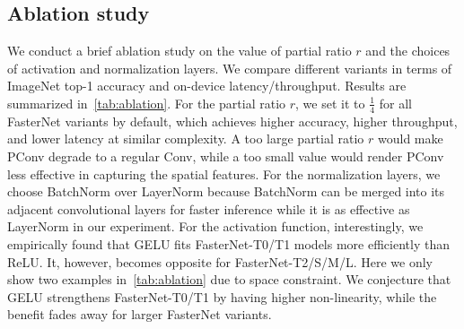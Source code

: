 \subsection{Ablation study}
We conduct a brief ablation study on the value of partial ratio $r$ and the choices of activation and normalization layers. We compare different variants in terms of ImageNet top-1 accuracy and on-device latency/throughput. Results are summarized in~\cref{tab:ablation}. For the partial ratio $r$, we set it to $\frac{1}{4}$ for all FasterNet variants by default, which achieves higher accuracy, higher throughput, and lower latency at similar complexity. A too large partial ratio $r$ would make PConv degrade to a regular Conv, while a too small value would render PConv less effective in capturing the spatial features. 
For the normalization layers, we choose BatchNorm over LayerNorm because BatchNorm can be merged into its adjacent convolutional layers for faster inference while it is as effective as LayerNorm in our experiment.
For the activation function, interestingly, we empirically found that GELU fits FasterNet-T0/T1 models more efficiently than ReLU. It, however, becomes opposite for FasterNet-T2/S/M/L. Here we only show two examples in~\cref{tab:ablation} due to space constraint. We conjecture that GELU strengthens FasterNet-T0/T1 by having higher non-linearity, while the benefit fades away for larger FasterNet variants.